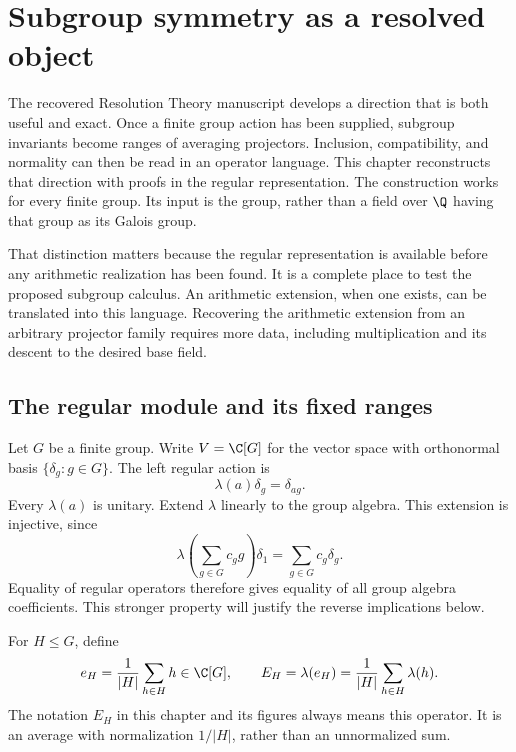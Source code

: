 \chapter{Subgroup symmetry as a resolved object}
\label{ch:subgroup-resolution}

The recovered Resolution Theory manuscript develops a direction that is both useful and exact. Once a finite group action has been supplied, subgroup invariants become ranges of averaging projectors. Inclusion, compatibility, and normality can then be read in an operator language. This chapter reconstructs that direction with proofs in the regular representation. The construction works for every finite group. Its input is the group, rather than a field over \(\Q\) having that group as its Galois group.

That distinction matters because the regular representation is available before any arithmetic realization has been found. It is a complete place to test the proposed subgroup calculus. An arithmetic extension, when one exists, can be translated into this language. Recovering the arithmetic extension from an arbitrary projector family requires more data, including multiplication and its descent to the desired base field.

\section{The regular module and its fixed ranges}

Let \(G\) be a finite group. Write \(V=\C[G]\) for the vector space with orthonormal basis \(\{\delta_g:g\in G\}\). The left regular action is
\begin{equation}
 \lambda(a)\delta_g=\delta_{ag}.
 \label{eq:b-regular-action}
\end{equation}
Every \(\lambda(a)\) is unitary. Extend \(\lambda\) linearly to the group algebra. This extension is injective, since
\begin{equation}
 \lambda\!\left(\sum_{g\in G}c_g g\right)\delta_1
 =\sum_{g\in G}c_g\delta_g.
 \label{eq:b-regular-faithfulness}
\end{equation}
Equality of regular operators therefore gives equality of all group algebra coefficients. This stronger property will justify the reverse implications below.

For \(H\leq G\), define
\begin{equation}
 e_H=\frac1{|H|}\sum_{h\in H}h\in\C[G],
 \qquad
 E_H=\lambda(e_H)=\frac1{|H|}\sum_{h\in H}\lambda(h).
 \label{eq:b-subgroup-average}
\end{equation}
The notation \(E_H\) in this chapter and its figures always means this operator. It is an average with normalization \(1/|H|\), rather than an unnormalized sum.

